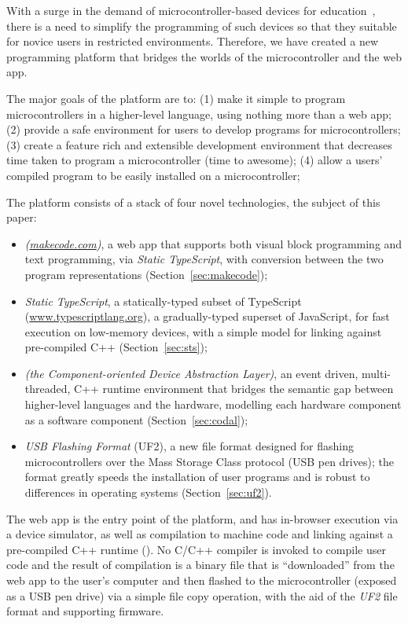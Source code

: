 With a surge in the demand of microcontroller-based devices for education~\cite{XYZ}, 
there is a need to simplify the programming of such devices so that they suitable 
for novice users in restricted environments.
Therefore, we have created a new programming platform that bridges the worlds of 
the microcontroller and the web app. 

The major goals of the platform are to:
(1) make it simple to program microcontrollers in a higher-level language,
using nothing more than a web app;
(2) provide a safe environment for users to develop programs for microcontrollers;
(3) create a feature rich and extensible development environment that decreases time taken to program a microcontroller (time to awesome);
(4) allow a users' compiled program to be easily installed on a microcontroller;


The platform consists of a stack of four novel technologies, the subject of
this paper:
\begin{itemize}
\item \emph{\MC (\href{https://makecode.com}{makecode.com})}, a web app that supports both visual block programming and text programming,
via \emph{Static TypeScript}, with conversion between the two program representations (Section~\ref{sec:makecode});

\item \emph{Static TypeScript}, a statically-typed subset of TypeScript (\url{www.typescriptlang.org}),
a gradually-typed superset of JavaScript, for fast execution on low-memory devices, with
a simple model for linking against pre-compiled C++ (Section~\ref{sec:sts});

\item \emph{\CO (the Component-oriented Device Abstraction Layer)}, an event driven, multi-threaded, C++ runtime environment that bridges the semantic gap between higher-level languages and the hardware,
modelling each hardware component as a software component (Section~\ref{sec:codal});

\item \emph{USB Flashing Format} (UF2), a new file format designed for flashing microcontrollers 
over the Mass Storage Class protocol (USB pen drives); the format greatly speeds the installation of user
programs and is robust to differences in operating systems (Section~\ref{sec:uf2}).
\end{itemize}
The \MC web app is the entry point of the platform, and has in-browser execution via a device simulator, as well as compilation to machine code and linking against a
pre-compiled C++ runtime (\emph{\CON}). No C/C++ compiler is invoked to compile user code and the result of compilation is a binary file that is ``downloaded'' from the web app to the user's
computer and then flashed to the microcontroller (exposed as a USB pen drive) 
via a simple file copy operation,  with the aid of the \emph{UF2} file format and supporting firmware. 


